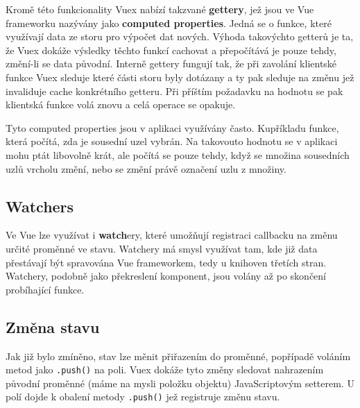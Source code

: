 Kromě této funkcionality Vuex nabízí takzvané \textbf{gettery}, jež jsou ve Vue frameworku nazývány jako \textbf{computed properties}. Jedná se o funkce, které využívají data ze storu pro výpočet dat nových. Výhoda takovýchto getterů je ta, že Vuex dokáže výsledky těchto funkcí cachovat a přepočítává je pouze tehdy, změní-li se data původní. Interně gettery fungují tak, že při zavolání klientské funkce Vuex sleduje které části storu byly dotázany a ty pak sleduje na změnu jež invaliduje cache konkrétního getteru. Při příštím požadavku na hodnotu se pak klientská funkce volá znovu a celá operace se opakuje.

Tyto computed properties jsou v aplikaci využívány často. Kupříkladu funkce, která počítá, zda je sousední uzel vybrán. Na takovouto hodnotu se v aplikaci mohu ptát libovolně krát, ale počítá se pouze tehdy, když se množina sousedních uzlů vrcholu změní, nebo se změní právě označení uzlu z množiny.

\subsection{Watchers}

Ve Vue lze využívat i \textbf{watch}ery, které umožňují registraci callbacku na změnu určité proměnné ve stavu. Watchery má smysl využívat tam, kde již data přestávají být spravována Vue frameworkem, tedy u knihoven třetích stran. Watchery, podobně jako překreslení komponent, jsou volány až po skončení probíhající funkce.

\subsection{Změna stavu}

Jak již bylo zmíněno, stav lze měnit přiřazením do proměnné, popřípadě voláním metod jako \texttt{.push()} na poli. Vuex dokáže tyto změny sledovat nahrazením původní proměnné (máme na mysli položku objektu) JavaScriptovým setterem. U polí dojde k obalení metody \texttt{.push()} jež registruje změnu stavu.

